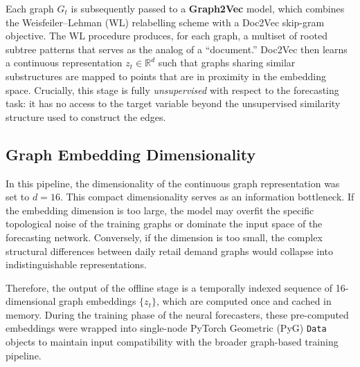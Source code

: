 Each graph \(G_t\) is subsequently passed to a \textbf{Graph2Vec} model, which combines the Weisfeiler--Lehman (WL) relabelling scheme with a Doc2Vec skip-gram objective. The WL procedure produces, for each graph, a multiset of rooted subtree patterns that serves as the analog of a ``document.” Doc2Vec then learns a continuous representation \(z_t \in \mathbb{R}^{d}\) such that graphs sharing similar substructures are mapped to points that are in proximity in the embedding space. Crucially, this stage is fully \emph{unsupervised} with respect to the forecasting task: it has no access to the target variable beyond the unsupervised similarity structure used to construct the edges.

\subsection{Graph Embedding Dimensionality}
In this pipeline, the dimensionality of the continuous graph representation was set to \(d=16\). This compact dimensionality serves as an information bottleneck. If the embedding dimension is too large, the model may overfit the specific topological noise of the training graphs or dominate the input space of the forecasting network. Conversely, if the dimension is too small, the complex structural differences between daily retail demand graphs would collapse into indistinguishable representations. 

Therefore, the output of the offline stage is a temporally indexed sequence of 16-dimensional graph embeddings \(\{z_t\}\), which are computed once and cached in memory. During the training phase of the neural forecasters, these pre-computed embeddings were wrapped into single-node PyTorch Geometric (PyG) \texttt{Data} objects to maintain input compatibility with the broader graph-based training pipeline.

